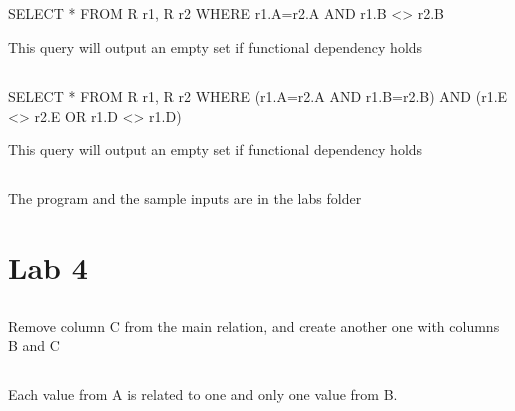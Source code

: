 \documentclass[a4paper]{article}
\begin{document}
\subsection{}
SELECT * FROM R r1, R r2 WHERE r1.A=r2.A AND r1.B <> r2.B

This query will output an empty set if functional dependency holds
\subsection{}
SELECT * FROM R r1, R r2 WHERE (r1.A=r2.A AND r1.B=r2.B) AND (r1.E <> r2.E OR
r1.D <> r1.D)

This query will output an empty set if functional dependency holds
\subsection{}
The program and the sample inputs are in the labs folder
\section{Lab 4}
\subsection{}
Remove column C from the main relation, and create another one with columns B
and C
\subsection{}
Each value from A is related to one and only one value from B.
\end{document}
